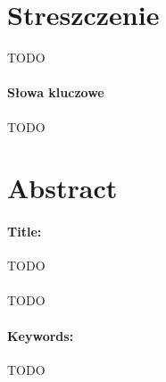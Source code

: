 \documentclass[12pt,a4paper,twoside]{report}
\begin{document}
\thispagestyle{empty} %
\section*{Streszczenie}
TODO
\paragraph{Słowa kluczowe} TODO

\section*{Abstract}
\paragraph{Title:} TODO\\\\
TODO
\paragraph{Keywords:} TODO

\newpage
\tableofcontents
\newpage











%
% 
%
%
\end{document}
